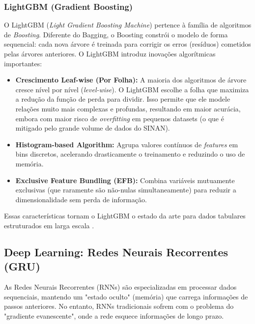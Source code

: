 \documentclass[12pt, a4paper]{report}
\begin{document}
\subsubsection{LightGBM (Gradient Boosting)}
O LightGBM (\textit{Light Gradient Boosting Machine}) pertence à família de algoritmos de \textit{Boosting}. Diferente do Bagging, o Boosting constrói o modelo de forma sequencial: cada nova árvore é treinada para corrigir os erros (resíduos) cometidos pelas árvores anteriores. O LightGBM introduz inovações algorítmicas importantes:
\begin{itemize}
    \item \textbf{Crescimento Leaf-wise (Por Folha):} A maioria dos algoritmos de árvore cresce nível por nível (\textit{level-wise}). O LightGBM escolhe a folha que maximiza a redução da função de perda para dividir. Isso permite que ele modele relações muito mais complexas e profundas, resultando em maior acurácia, embora com maior risco de \textit{overfitting} em pequenos datasets (o que é mitigado pelo grande volume de dados do SINAN).
    \item \textbf{Histogram-based Algorithm:} Agrupa valores contínuos de \textit{features} em bins discretos, acelerando drasticamente o treinamento e reduzindo o uso de memória.
    \item \textbf{Exclusive Feature Bundling (EFB):} Combina variáveis mutuamente exclusivas (que raramente são não-nulas simultaneamente) para reduzir a dimensionalidade sem perda de informação.
\end{itemize}
Essas características tornam o LightGBM o estado da arte para dados tabulares estruturados em larga escala \citep{ke2017lightgbm}.

\subsection{Deep Learning: Redes Neurais Recorrentes (GRU)}

As Redes Neurais Recorrentes (RNNs) são especializadas em processar dados sequenciais, mantendo um "estado oculto" (memória) que carrega informações de passos anteriores. No entanto, RNNs tradicionais sofrem com o problema do "gradiente evanescente", onde a rede esquece informações de longo prazo.
\end{document}
